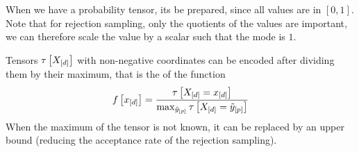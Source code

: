 When we have a probability tensor, its \activationCircuit{} be prepared, since all values are in $[0,1]$.
Note that for rejection sampling, only the quotients of the values are important, we can therefore scale the value by a scalar such that the mode is $1$.

Tensors $\tau\left[X_{[d]}\right]$ with non-negative coordinates can be encoded after dividing them by their maximum, that is the \activationCircuit{} of the function
\begin{align*}
    f\left[x_{[d]}\right]
    = \frac{\tau\left[X_{[d]}=x_{[d]}\right]}{\max_{\tilde{y}_{[p]}} \tau\left[X_{[d]}=\tilde{y}_{[p]}\right]}
\end{align*}
When the maximum of the tensor is not known, it can be replaced by an upper bound (reducing the acceptance rate of the rejection sampling).

